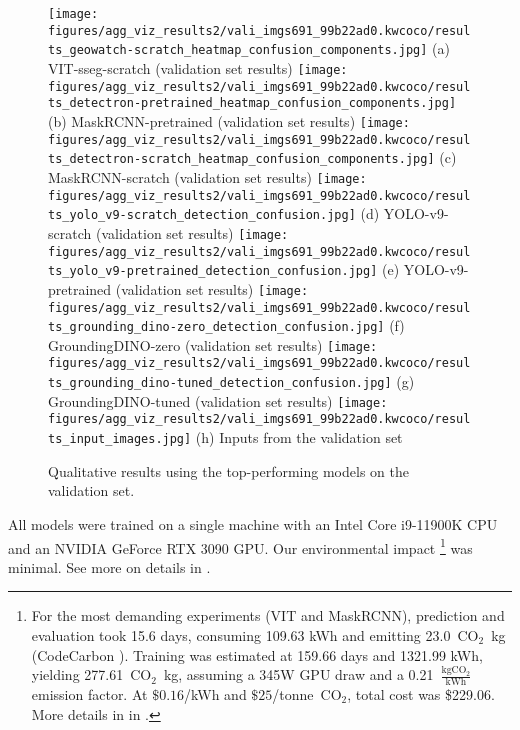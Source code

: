 \documentclass{article}
\newcommand{\cotwo}{\ensuremath{\mathrm{CO_2}}}
\begin{document}
\begin{figure*}[ht]
\centering
\texttt{[image: figures/agg\_viz\_results2/vali\_imgs691\_99b22ad0.kwcoco/results\_geowatch-scratch\_heatmap\_confusion\_components.jpg]}%
\hfill
(a) VIT-sseg-scratch (validation set results)
\texttt{[image: figures/agg\_viz\_results2/vali\_imgs691\_99b22ad0.kwcoco/results\_detectron-pretrained\_heatmap\_confusion\_components.jpg]}%
\hfill
(b) MaskRCNN-pretrained (validation set results)
\texttt{[image: figures/agg\_viz\_results2/vali\_imgs691\_99b22ad0.kwcoco/results\_detectron-scratch\_heatmap\_confusion\_components.jpg]}%
\hfill
(c) MaskRCNN-scratch (validation set results)
\texttt{[image: figures/agg\_viz\_results2/vali\_imgs691\_99b22ad0.kwcoco/results\_yolo\_v9-scratch\_detection\_confusion.jpg]}%
\hfill
(d) YOLO-v9-scratch (validation set results)
\texttt{[image: figures/agg\_viz\_results2/vali\_imgs691\_99b22ad0.kwcoco/results\_yolo\_v9-pretrained\_detection\_confusion.jpg]}%
\hfill
(e) YOLO-v9-pretrained (validation set results)
\texttt{[image: figures/agg\_viz\_results2/vali\_imgs691\_99b22ad0.kwcoco/results\_grounding\_dino-zero\_detection\_confusion.jpg]}%
\hfill
(f) GroundingDINO-zero (validation set results)
\texttt{[image: figures/agg\_viz\_results2/vali\_imgs691\_99b22ad0.kwcoco/results\_grounding\_dino-tuned\_detection\_confusion.jpg]}%
\hfill
(g) GroundingDINO-tuned (validation set results)
\texttt{[image: figures/agg\_viz\_results2/vali\_imgs691\_99b22ad0.kwcoco/results\_input\_images.jpg]}%
\hfill
(h) Inputs from the validation set
\caption[]{
    Qualitative results using the top-performing models on the validation set.
}
\label{fig:vali_results_all_models}
\end{figure*}


All models were trained on a single machine with an Intel Core i9-11900K CPU and an NVIDIA GeForce RTX 3090
GPU. 
Our environmental impact
\footnote{For the most demanding experiments (VIT and MaskRCNN), prediction and evaluation took 15.6 days, consuming 109.63 kWh and emitting 23.0~\cotwo~kg (CodeCarbon \cite{lacoste2019codecarbon}). Training was estimated at 159.66 days and 1321.99 kWh, yielding 277.61~\cotwo~kg, assuming a 345W GPU draw and a 0.21~$\frac{\textrm{kg}\cotwo{}}{\textrm{kWh}}$ emission factor. At $\$0.16$/kWh and $\$25$/tonne~\cotwo, total cost was \$229.06. More details in in .}
was minimal.
See more on details in .
\end{document}
